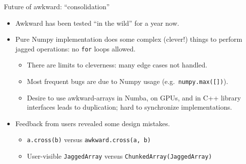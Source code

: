 \documentclass[aspectratio=169]{beamer}
\begin{document}
\begin{frame}{Future of awkward: ``consolidation''}
\Large
\vspace{0.35 cm}
\begin{itemize}\setlength{\itemsep}{0.25 cm}
\item<1-> Awkward has been tested ``in the wild'' for a year now.
\item<2-> Pure Numpy implementation does some complex (clever!) things to perform jagged operations: no \texttt{for} loops allowed.

\vspace{0.1 cm}
\begin{itemize}\setlength{\itemsep}{0.2 cm}
\item<3-> \large There are limits to cleverness: many edge cases not handled.
\item<4-> \large Most frequent bugs are due to Numpy usage (e.g.\ \texttt{numpy.max([])}).
\item<5-> \large Desire to use awkward-arrays in Numba, on GPUs, and in C++ library interfaces leads to duplication; hard to synchronize implementations.
\end{itemize}

\item<6-> Feedback from users revealed some design mistakes.

\vspace{0.1 cm}
\begin{itemize}\setlength{\itemsep}{0.2 cm}
\item<7-> \large \texttt{a.cross(b)} versus \texttt{awkward.cross(a, b)}
\item<8-> \large User-visible \texttt{JaggedArray} versus \texttt{ChunkedArray(JaggedArray)}
\end{itemize}
\end{itemize}
\end{frame}
\end{document}
